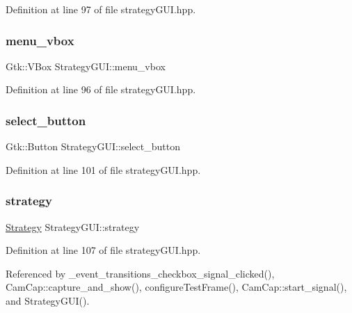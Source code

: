 Definition at line 97 of file strategy\+G\+U\+I.\+hpp.

\mbox{\label{class_strategy_g_u_i_a22dd39915a18f382a3a85ce9445a46ea}} 
\subsubsection{\texorpdfstring{menu\+\_\+vbox}{menu\_vbox}}
{\footnotesize\ttfamily Gtk\+::\+V\+Box Strategy\+G\+U\+I\+::menu\+\_\+vbox}



Definition at line 96 of file strategy\+G\+U\+I.\+hpp.

\mbox{\label{class_strategy_g_u_i_a9dee0f0a4764ed3e37d046dc2d2ff48d}} 
\subsubsection{\texorpdfstring{select\+\_\+button}{select\_button}}
{\footnotesize\ttfamily Gtk\+::\+Button Strategy\+G\+U\+I\+::select\+\_\+button}



Definition at line 101 of file strategy\+G\+U\+I.\+hpp.

\mbox{\label{class_strategy_g_u_i_af8e7b112adca9d3de45cbb0ab00a80bb}} 
\subsubsection{\texorpdfstring{strategy}{strategy}}
{\footnotesize\ttfamily \hyperlink{class_strategy}{Strategy} Strategy\+G\+U\+I\+::strategy}



Definition at line 107 of file strategy\+G\+U\+I.\+hpp.



Referenced by \+\_\+event\+\_\+transitions\+\_\+checkbox\+\_\+signal\+\_\+clicked(), Cam\+Cap\+::capture\+\_\+and\+\_\+show(), configure\+Test\+Frame(), Cam\+Cap\+::start\+\_\+signal(), and Strategy\+G\+U\+I().

